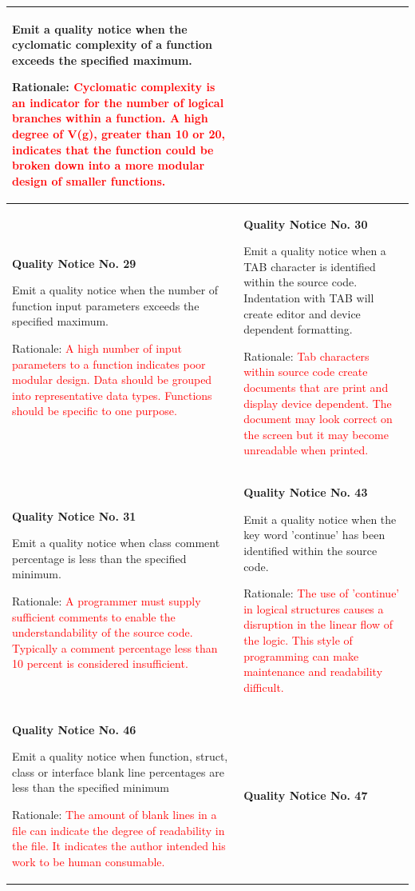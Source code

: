 {\begin{longtable}{||p{}|p{}||}
Emit a quality notice when the cyclomatic complexity of a function exceeds the specified maximum.

Rationale:  \textcolor{red}{Cyclomatic complexity is an indicator for the number of logical branches within a function.  A high degree of V(g), greater than 10 or 20, indicates that the function could be broken down into a more modular design of smaller functions.}
    \\
    \hline
        \textbf{Quality Notice No. 29}
        
Emit a quality notice when the number of function input parameters exceeds the specified maximum.

Rationale:  \textcolor{red}{A high number of input parameters to a function indicates poor modular design.  Data should be grouped into representative data types.  Functions should be specific to one purpose.}
 & \textbf{Quality Notice No. 30}
 
Emit a quality notice when a TAB character is identified within the source code. Indentation with TAB will create editor and device dependent formatting.

Rationale:  \textcolor{red}{Tab characters within source code create documents that are print and display device dependent.  The document may look correct on the screen but it may become unreadable when printed.}
    \\
    \hline
        \textbf{Quality Notice No. 31}
        
Emit a quality notice when class comment
percentage is less than the specified minimum.

Rationale:  \textcolor{red}{A programmer must supply sufficient comments to enable the understandability of the source code.  Typically a comment percentage less than 10 percent is considered insufficient.}
 & \textbf{Quality Notice No. 43}
 
Emit a quality notice when the key word 'continue' has been identified within the source code.

Rationale:  \textcolor{red}{The use of 'continue' in logical structures causes a disruption in the linear flow of the logic.  This style of  programming can make maintenance and readability difficult.}
    \\
    \hline
        \textbf{Quality Notice No. 46}
        
Emit a quality notice when function, struct, class or interface blank line percentages are less than the specified minimum
 
Rationale:  \textcolor{red}{The amount of blank lines in a file can indicate the degree of readability in the file. It indicates the author intended his work to be human consumable.}
 & \textbf{Quality Notice No. 47}
 

\end{longtable}}
